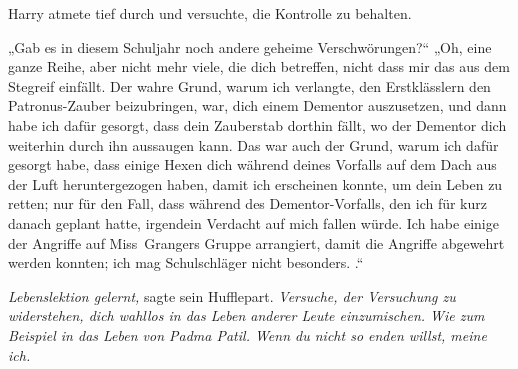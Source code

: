 Harry atmete tief durch und versuchte, die Kontrolle zu behalten.

„Gab es in diesem Schuljahr noch andere geheime Verschwörungen?“
„Oh, eine ganze Reihe, aber nicht mehr viele, die dich betreffen, nicht dass mir das aus dem Stegreif einfällt. Der wahre Grund, warum ich verlangte, den Erstklässlern den Patronus-Zauber beizubringen, war, dich einem Dementor auszusetzen, und dann habe ich dafür gesorgt, dass dein Zauberstab dorthin fällt, wo der Dementor dich weiterhin durch ihn aussaugen kann.  Das war auch der Grund, warum ich dafür gesorgt habe, dass einige Hexen dich während deines Vorfalls auf dem Dach aus der Luft heruntergezogen haben, damit ich erscheinen konnte, um dein Leben zu retten; nur für den Fall, dass während des Dementor-Vorfalls, den ich für kurz danach geplant hatte, irgendein Verdacht auf mich fallen würde.  Ich habe einige der Angriffe auf Miss~Grangers Gruppe arrangiert, damit die Angriffe abgewehrt werden konnten; ich mag Schulschläger nicht besonders. .“

\emph{Lebenslektion gelernt,} sagte sein Hufflepart. \emph{Versuche, der Versuchung zu widerstehen, dich wahllos in das Leben anderer Leute einzumischen. Wie zum Beispiel in das Leben von Padma Patil. Wenn du nicht so enden willst, meine ich.}

